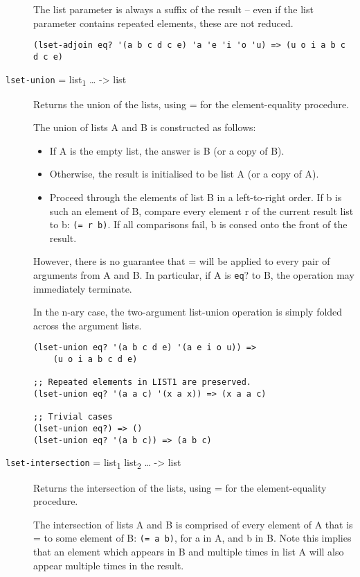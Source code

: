 \begin{description}
The list parameter is always a suffix of the result -- even if the list
parameter contains repeated elements, these are not reduced.

\begin{verbatim}
(lset-adjoin eq? '(a b c d c e) 'a 'e 'i 'o 'u) => (u o i a b c d c e)
\end{verbatim}
\item[ \href{}{} \texttt{lset-union} = list\textsubscript{1} \ldots{}
-\textgreater{} list ]
Returns the union of the lists, using = for the element-equality
procedure.

The union of lists A and B is constructed as follows:

\begin{itemize}
\tightlist
\item
  If A is the empty list, the answer is B (or a copy of B).
\item
  Otherwise, the result is initialised to be list A (or a copy of A).
\item
  Proceed through the elements of list B in a left-to-right order. If b
  is such an element of B, compare every element r of the current result
  list to b: \texttt{(=\ r\ b)}. If all comparisons fail, b is consed
  onto the front of the result.
\end{itemize}

However, there is no guarantee that = will be applied to every pair of
arguments from A and B. In particular, if A is \texttt{eq}? to B, the
operation may immediately terminate.

In the n-ary case, the two-argument list-union operation is simply
folded across the argument lists.

\begin{verbatim}
(lset-union eq? '(a b c d e) '(a e i o u)) => 
    (u o i a b c d e)

;; Repeated elements in LIST1 are preserved.
(lset-union eq? '(a a c) '(x a x)) => (x a a c)

;; Trivial cases
(lset-union eq?) => ()
(lset-union eq? '(a b c)) => (a b c)
\end{verbatim}
\item[ \href{}{} \texttt{lset-intersection} = list\textsubscript{1}
list\textsubscript{2} \ldots{} -\textgreater{} list ]
Returns the intersection of the lists, using = for the element-equality
procedure.

The intersection of lists A and B is comprised of every element of A
that is = to some element of B: \texttt{(=\ a\ b)}, for a in A, and b in
B. Note this implies that an element which appears in B and multiple
times in list A will also appear multiple times in the result.


\end{description}
